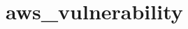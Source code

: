 \documentclass[twoside,12pt]{report}
\begin{document}
    \chapter{aws\_vulnerability}
    \label{app:aws_vulnerability}
    
    
    
    \beforebibliography
    
    
    
    \closingpage
    
    
\end{document}
